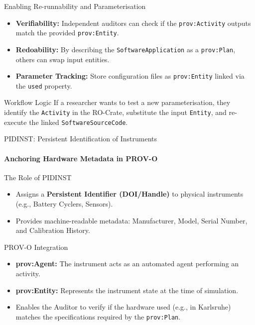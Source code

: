 \documentclass[aspectratio=169]{beamer}
\begin{document}
\begin{frame}{Enabling Re-runnability and Parameterisation}
    \begin{itemize}
        \item \textbf{Verifiability:} Independent auditors can check if the \texttt{prov:Activity} outputs match the provided \texttt{prov:Entity}.
        \item \textbf{Redoability:} By describing the \texttt{SoftwareApplication} as a \texttt{prov:Plan}, others can swap input entities.
        \item \textbf{Parameter Tracking:} Store configuration files as \texttt{prov:Entity} linked via the \texttt{used} property.
    \end{itemize}
    \begin{exampleblock}{Workflow Logic}
        If a researcher wants to test a new parameterisation, they identify the \texttt{Activity} in the RO-Crate, substitute the input \texttt{Entity}, and re-execute the linked \texttt{SoftwareSourceCode}.
    \end{exampleblock}
\end{frame}

\begin{frame}{PIDINST: Persistent Identification of Instruments}
    \framesubtitle{Anchoring Hardware Metadata in PROV-O}
    
    \begin{block}{The Role of PIDINST}
        \begin{itemize}
            \item Assigns a \textbf{Persistent Identifier (DOI/Handle)} to physical instruments (e.g., Battery Cyclers, Sensors).
            \item Provides machine-readable metadata: Manufacturer, Model, Serial Number, and Calibration History.
        \end{itemize}
    \end{block}

    \begin{block}{PROV-O Integration}
        \begin{itemize}
            \item \textbf{prov:Agent:} The instrument acts as an automated agent performing an activity.
            \item \textbf{prov:Entity:} Represents the instrument state at the time of simulation.
            \item Enables the Auditor to verify if the hardware used (e.g., in Karlsruhe) matches the specifications required by the \texttt{prov:Plan}.
        \end{itemize}
    \end{block}
\end{frame}
\end{document}
